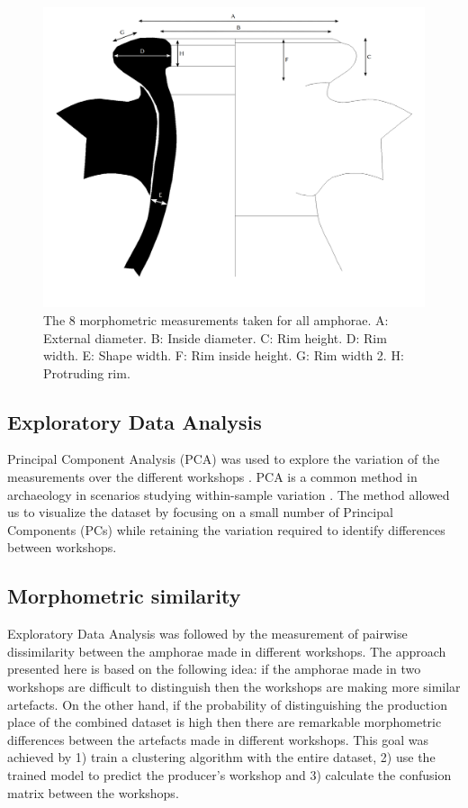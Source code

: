\documentclass[review]{elsarticle}
\begin{document}
\begin{figure}[htp]
	\centering
\includegraphics[width=\linewidth]{figs/mesures.pdf}
\caption{The 8 morphometric measurements taken for all amphorae. A: External diameter. B: Inside diameter. C: Rim height. D: Rim width. E: Shape width. F: Rim inside height. G: Rim width 2. H: Protruding rim.}
\label{mesures}
\end{figure} 

\subsection{Exploratory Data Analysis}

Principal Component Analysis (PCA) was used to explore the variation of the measurements over the different workshops \citep{jolliffe_principal_2002}. PCA is a common method in archaeology in scenarios studying within-sample variation \citep{shennan_quantifying_1997, li_crossbows_2014, schillinger_differences_2016}. The method allowed us to visualize the dataset by focusing on a small number of Principal Components (PCs) while retaining the variation required to identify differences between workshops. 

\subsection{Morphometric similarity} 

Exploratory Data Analysis was followed by the measurement of pairwise dissimilarity between the amphorae made in different workshops. The approach presented here is based on the following idea: if the amphorae made in two workshops are difficult to distinguish then the workshops are making more similar artefacts. On the other hand, if the probability of distinguishing the production place of the combined dataset is high then there are remarkable morphometric differences between the artefacts made in different workshops. This goal was achieved by 1) train a clustering algorithm with the entire dataset, 2) use the trained model to predict the producer's workshop and 3) calculate the confusion matrix between the workshops.
\end{document}
